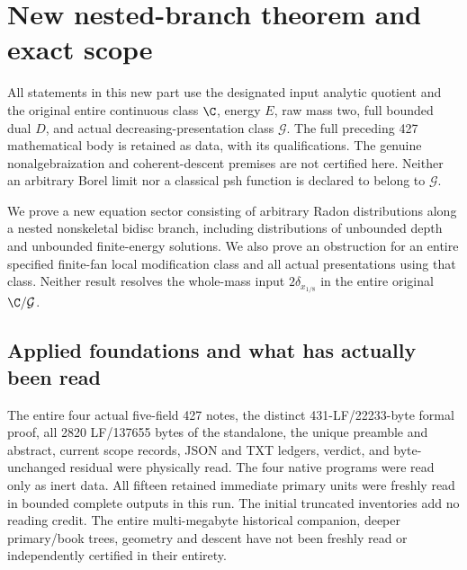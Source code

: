 \section{New nested-branch theorem and exact scope}
All statements in this new part use the designated input analytic quotient
and the original entire continuous class $\C$, energy $E$, raw mass two,
full bounded dual $D$, and actual decreasing-presentation class $\mathcal G$.
The full preceding 427 mathematical body is retained as data, with its
qualifications. The genuine nonalgebraization and coherent-descent premises
are not certified here. Neither an arbitrary Borel limit nor a classical
psh function is declared to belong to $\mathcal G$.

We prove a new equation sector consisting of arbitrary Radon distributions
along a nested nonskeletal bidisc branch, including distributions of
unbounded depth and unbounded finite-energy solutions. We also prove an
obstruction for an entire specified finite-fan local modification class and
all actual presentations using that class. Neither result resolves the
whole-mass input $2\delta_{x_{1/8}}$ in the entire original $\C/\mathcal G$.

\subsection{Applied foundations and what has actually been read}
The entire four actual five-field 427 notes, the distinct 431-LF/22233-byte
formal proof, all 2820 LF/137655 bytes of the standalone, the unique preamble
and abstract, current scope records, JSON and TXT ledgers, verdict, and
byte-unchanged residual were physically read. The four native programs were
read only as inert data. All fifteen retained immediate primary units were
freshly read in bounded complete outputs in this run. The initial truncated
inventories add no reading credit. The entire multi-megabyte historical
companion, deeper primary/book trees, geometry and descent have not been
freshly read or independently certified in their entirety.

